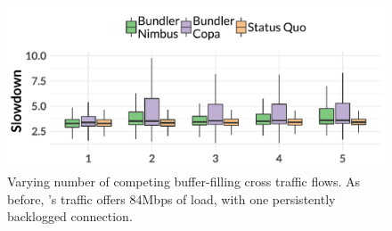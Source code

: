 \begin{figure}
    \centering
\begin{knitrout}
\color{fgcolor}
\includegraphics[width=\maxwidth]{figure/robust:cr-elastic-1} 

\end{knitrout}
    \caption{Varying number of competing buffer-filling cross traffic flows. As before, \name's traffic offers 84Mbps of load, with one persistently backlogged connection.}
    \label{fig:robust:cr-elastic}
\end{figure}
